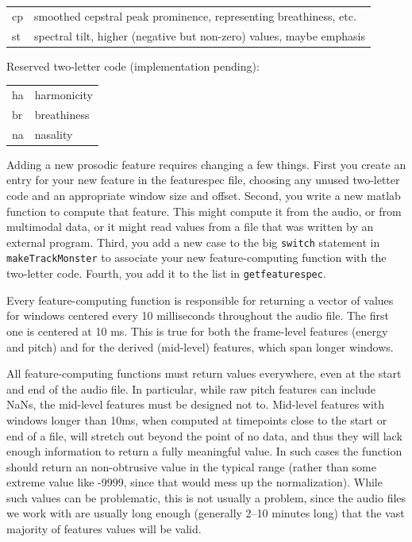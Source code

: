 \documentclass[11pt]{article}
\begin{document}
\begin{tabular}{ll}  
  cp  & smoothed cepstral peak prominence, representing breathiness, etc. \\
  st  & spectral tilt, higher (negative but non-zero) values, maybe emphasis \\
\end{tabular}


Reserved two-letter code (implementation pending): 

\begin{tabular}{ll}  
  ha  & harmonicity \\
  br  & breathiness \\
  na & nasality
\end{tabular}

Adding a new prosodic feature requires changing a few things.  First
you create an entry for your new feature in the featurespec file,
choosing any unused two-letter code and an appropriate window size and
offset.  Second, you write a new matlab function to compute that
feature.  This might compute it from the audio, or from multimodal
data, or it might read values from a file that was written by an
external program.  Third, you add a new case to the big {\tt switch}
statement in {\tt makeTrackMonster} to associate your new
feature-computing function with the two-letter code. Fourth, you add it to the list in {\tt getfeaturespec}.

Every feature-computing function is responsible for returning a vector
of values for windows centered every 10 milliseconds throughout the
audio file.  The first one is centered at 10 ms.  This is true for
both the frame-level features (energy and pitch) and for the derived
(mid-level) features, which span longer windows.  

All feature-computing functions must return values everywhere, even at
the start and end of the audio file.  In particular, while raw pitch
features can include NaNs, the mid-level features must be designed not
to. Mid-level features with windows longer than 10ms, when computed at
timepoints close to the start or end of a file, will stretch out
beyond the point of no data, and thus they will lack enough
information to return a fully meaningful value.  In such cases the
function should return an non-obtrusive value in the typical range
(rather than some extreme value like -9999, since that would mess up
the normalization).  While such values can be problematic, this is not
usually a problem, since the audio files we work with are usually long
enough (generally 2--10 minutes long) that the vast majority of
features values will be valid.
\end{document}
